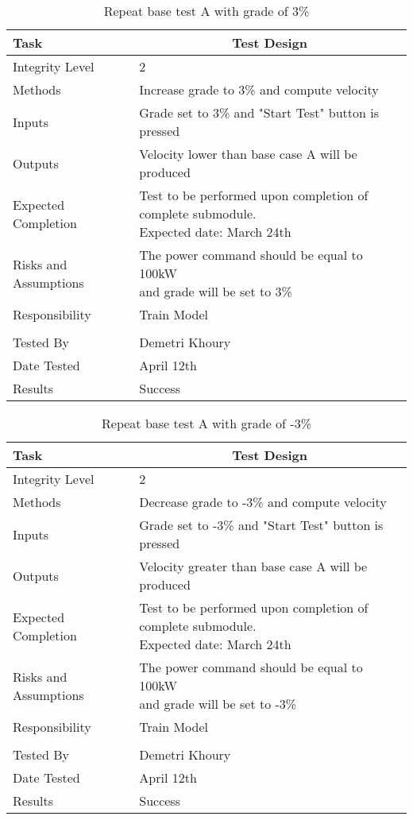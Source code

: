 \documentclass[]{article}
\begin{document}
	\begin{table}[H]
		\centering
		\caption{Repeat base test A with grade of 3\%}
		\begin{tabular}{|l|l|}
			\hline
			Task & \multicolumn{1}{c|}{Test Design} \\ \hline
			Integrity Level & 2 \\ \hline
			Methods & Increase grade to 3\% and compute velocity  \\ \hline
			Inputs &  Grade set to 3\% and "Start Test" button is pressed \\ \hline
			Outputs &  Velocity lower than base case A will be produced  \\ \hline
			Expected Completion & \parbox[t]{10cm}{Test to be performed upon completion of complete submodule.\\ Expected date: March 24th}\\ \hline
			Risks and Assumptions & \parbox[t]{10cm}{The power command should be equal to 100kW \\and grade will be set to 3\% }\\ \hline
			Responsibility & Train Model\\ \hline
			\\ \hline
			Tested By   &  Demetri Khoury\\	\hline
			Date Tested & \parbox[t]{10cm}{April 12th}\\ \hline
			Results & Success\\ \hline
		\end{tabular}
	\end{table}

	\begin{table}[H]
		\centering
		\caption{Repeat base test A with grade of -3\%}
		\begin{tabular}{|l|l|}
			\hline
			Task & \multicolumn{1}{c|}{Test Design} \\ \hline
			Integrity Level & 2 \\ \hline
			Methods & Decrease grade to -3\% and compute velocity  \\ \hline
			Inputs &  Grade set to -3\% and "Start Test" button is pressed \\ \hline
			Outputs &  Velocity greater than base case A will be produced  \\ \hline
			Expected Completion & \parbox[t]{10cm}{Test to be performed upon completion of complete submodule.\\ Expected date: March 24th}\\ \hline
			Risks and Assumptions &\parbox[t]{10cm}{ The power command should be equal to 100kW \\and grade will be set to -3\%} \\ \hline
			Responsibility & Train Model\\ \hline
			\\ \hline
			Tested By   &  Demetri Khoury\\	\hline
			Date Tested & \parbox[t]{10cm}{April 12th}\\ \hline
			Results & Success\\ \hline
		\end{tabular}
	\end{table}
   
\end{document}
